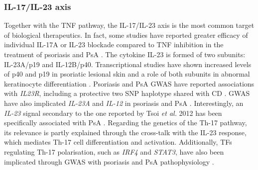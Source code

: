 \subsubsection*{IL-17/IL-23 axis}
Together with the TNF pathway, the IL-17/IL-23 axis is the most common target of biological therapeutics. In fact, some studies have reported greater efficacy of individual IL-17A or IL-23 blockade compared to TNF inhibition in the treatment of psoriasis and PsA \parencite{Griffiths2015,Blauvelt2017}. 
The cytokine IL-23 is formed of two subunits: IL-23A/p19 and IL-12B/p40. Transcriptional studies have shown increased levels of p40 and p19 in psoriatic lesional skin and a role of both subunits in abnormal keratinocyte differentiation \parencite{Lee2004,Zhu2012}. Psoriasis and PsA GWAS have reported associations with \textit{IL23R}, including a protective two SNP haplotype shared with CD \parencite{Nair2008, Strange2010, Tsoi2012}. GWAS have also implicated \textit{IL-23A} and \textit{IL-12} in psoriasis and PsA \parencite{Cargill2007,Strange2010,Tsoi2012}.
Interestingly, an \textit{IL-23} signal secondary to the one reported by Tsoi \textit{et al.} 2012 has been specifically associated with PsA \parencite{Bowes2015}. Regarding the genetics of the Th-17 pathway, its relevance is partly explained through the cross-talk with the IL-23 response, which mediates Th-17 cell differentiation and activation. Additionally, TFs regulating Th-17 polarisation, such as \textit{IRF4} and \textit{STAT3}, have also been implicated through GWAS with psoriasis and PsA pathophysiology \parencite{Tsoi2012,Huber2008,Harris2007}. 



